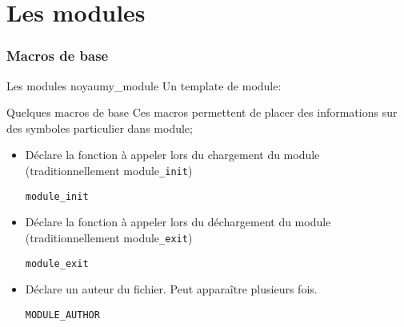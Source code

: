 %
%
%

\part{Les modules}

\begin{frame}
  \partpage
\end{frame}

\begin{frame}
  \tableofcontents
\end{frame}

\section{Macros de base}

\begin{frame}[fragile=singleslide]{Les modules noyau}{my\_module}
  Un template de module:
  
\end{frame}

\begin{frame}[fragile=singleslide]{Quelques macros de base}
  Ces macros  permettent de placer  des informations sur  des symboles
  particulier dans module;
  \begin{itemize} 
  \item Déclare  la fonction  à appeler lors  du chargement  du module
  (traditionnellement module\texttt{\_init})
    \begin{lstlisting} 
module_init
    \end{lstlisting} 
  \item Déclare la fonction à  appeler lors du déchargement du module
  (traditionnellement module\texttt{\_exit})
    \begin{lstlisting} 
module_exit
    \end{lstlisting} 
  \item Déclare un auteur du fichier. Peut apparaître plusieurs fois.
    \begin{lstlisting}
MODULE_AUTHOR
    \end{lstlisting}
  \end{itemize}
\end{frame}

